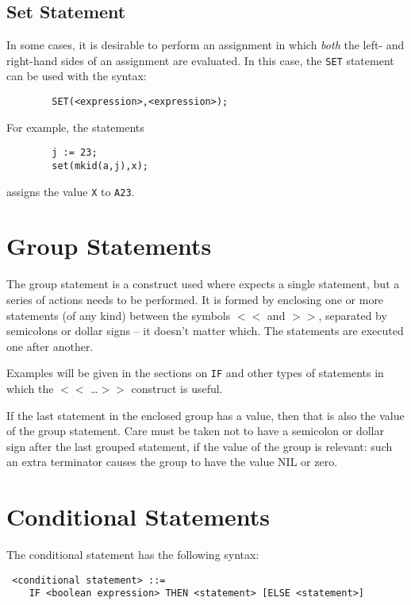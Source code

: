 \subsection{Set Statement}

In some cases, it is desirable to perform an assignment in which {\em both}
the left- and right-hand sides of an assignment are
evaluated.  In this case, the {\tt SET} statement can be used
with the syntax:

\begin{verbatim}
        SET(<expression>,<expression>);
\end{verbatim}
For example, the statements
\begin{verbatim}
        j := 23;
        set(mkid(a,j),x);
\end{verbatim}
assigns the value {\tt X} to {\tt A23}.

\section{Group Statements}

The group statement is a construct used where
{\REDUCE} expects a single statement, but a series of actions needs to be
performed.  It is formed by enclosing one or more statements (of any kind)
between the symbols {\tt $<<$} and {\tt $>>$}, separated by semicolons or
dollar signs -- it doesn't matter which.  The statements are executed one
after another.

Examples will be given in the sections on {\tt IF} and other
types of statements in which the {\tt $<<$} \ldots {\tt $>>$} construct is
useful.

If the last statement in the enclosed group has a value, then that is also
the value of the group statement.  Care must be taken not to have a
semicolon or dollar sign after the last grouped statement, if the value of
the group is relevant: such an extra terminator causes the group to have
the value NIL or zero.

\section{Conditional Statements}

The conditional statement has the following
syntax:

\begin{verbatim}
 <conditional statement> ::=
    IF <boolean expression> THEN <statement> [ELSE <statement>]
\end{verbatim}

